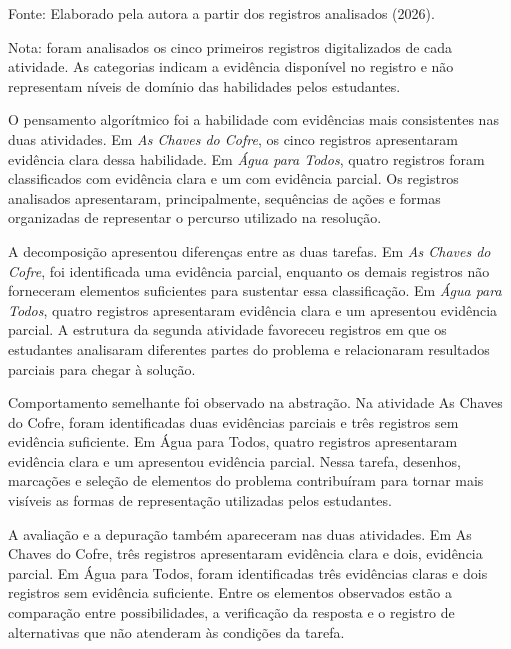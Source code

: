{\begin{table}[htbp]
\begin{tabularx}{\textwidth}
    \end{tabularx}

    \vspace{1mm}

    \begin{flushleft}
        \footnotesize
        Fonte: Elaborado pela autora a partir dos registros analisados (2026).

        Nota: foram analisados os cinco primeiros registros digitalizados de cada atividade. As categorias indicam a evidência disponível no registro e não representam níveis de domínio das habilidades pelos estudantes.
    \end{flushleft}

\end{table}
}

O pensamento algorítmico foi a habilidade com evidências mais consistentes nas duas atividades. Em \textit{As Chaves do Cofre}, os cinco registros apresentaram evidência clara dessa habilidade. Em
\textit{Água para Todos}, quatro registros foram classificados com evidência clara e um com evidência parcial. Os registros analisados apresentaram, principalmente, sequências de ações e formas organizadas de representar o percurso utilizado na resolução.

A decomposição apresentou diferenças entre as duas tarefas. Em \textit{As Chaves do Cofre}, foi identificada uma evidência parcial, enquanto os demais registros não forneceram elementos suficientes para sustentar essa classificação. Em \textit{Água para Todos}, quatro registros apresentaram evidência clara e um apresentou evidência parcial. A estrutura da segunda atividade favoreceu registros em que os estudantes analisaram diferentes partes do problema e relacionaram resultados parciais para chegar à solução.

Comportamento semelhante foi observado na abstração. Na atividade As Chaves do Cofre, foram identificadas duas evidências parciais e três registros sem evidência suficiente. Em Água para Todos, quatro registros apresentaram evidência clara e um apresentou evidência parcial. Nessa tarefa, desenhos, marcações e seleção de elementos do problema contribuíram para tornar mais visíveis as formas de representação utilizadas pelos estudantes.

A avaliação e a depuração também apareceram nas duas atividades. Em As Chaves do Cofre, três registros apresentaram evidência clara e dois, evidência parcial. Em Água para Todos, foram identificadas três evidências claras e dois registros sem evidência
suficiente. Entre os elementos observados estão a comparação entre possibilidades, a verificação da resposta e o registro de alternativas que não atenderam às condições da tarefa.

